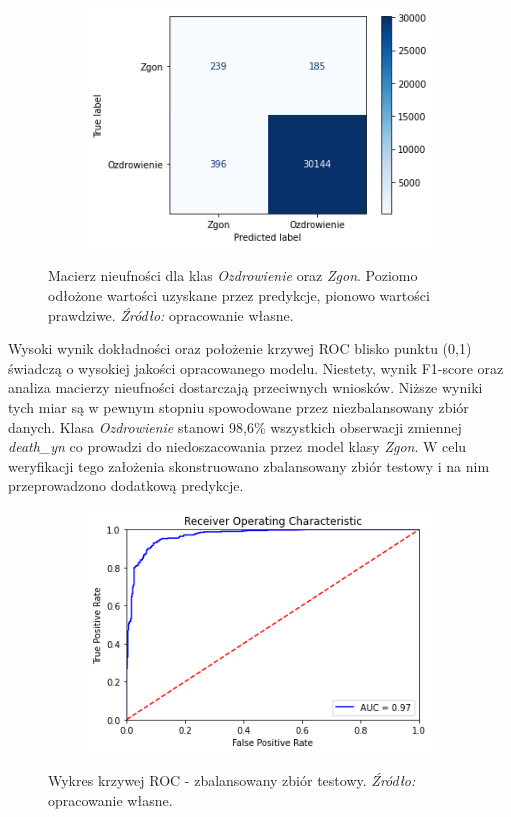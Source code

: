 \documentclass[polish, twoside, 12pt, a4paper]{article}
\theoremstyle{definition}
\theoremstyle{plain}
\theoremstyle{remark}
\begin{document}
\begin{figure}[H]
  \centering
  \begin{subfigure}[t]{\textwidth}
	\centering
    \includegraphics[width=10cm]{conf_matrix.png}
  \end{subfigure}
  \captionsetup{margin=10pt,font=small,labelfont=bf,width=.8\textwidth}
  \caption{Macierz nieufności dla klas \emph{Ozdrowienie} oraz \emph{Zgon}. Poziomo odłożone wartości uzyskane przez predykcje, pionowo wartości prawdziwe. \textit{Źródło:} opracowanie własne.}
\end{figure}

Wysoki wynik dokładności oraz położenie krzywej ROC blisko punktu (0,1) świadczą o wysokiej jakości opracowanego modelu. Niestety, wynik F1-score oraz analiza macierzy nieufności dostarczają przeciwnych wniosków. Niższe wyniki tych miar są w pewnym stopniu spowodowane przez niezbalansowany zbiór danych. Klasa \emph{Ozdrowienie} stanowi 98,6\% wszystkich obserwacji zmiennej \emph{death\_yn} co prowadzi do niedoszacowania przez model klasy \emph{Zgon}. W celu weryfikacji tego założenia skonstruowano zbalansowany zbiór testowy i na nim przeprowadzono dodatkową predykcje. 

\begin{figure}[H]
  \centering
  \begin{subfigure}[t]{\textwidth}
	\centering
    \includegraphics[width=10cm]{roc-bs.png}
  \end{subfigure}
  \captionsetup{margin=10pt,font=small,labelfont=bf,width=.8\textwidth}
  \caption{Wykres krzywej ROC - zbalansowany zbiór testowy. \textit{Źródło:} opracowanie własne.}
\end{figure}
\end{document}
